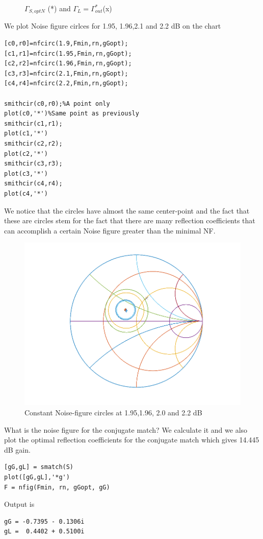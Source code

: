 \documentclass{article}
\begin{document}
\begin{multicols}{2}
\begin{figure}[H]
  \caption{$\Gamma_{S,optN}$ (*) and $\Gamma_L=\Gamma_{out}^*$(x)}
  \label{fig4}
\end{figure}
We plot Noise figure cirlces for 1.95, 1.96,2.1 and 2.2 dB on the chart
\begin{verbatim}
[c0,r0]=nfcirc(1.9,Fmin,rn,gGopt);
[c1,r1]=nfcirc(1.95,Fmin,rn,gGopt);
[c2,r2]=nfcirc(1.96,Fmin,rn,gGopt);
[c3,r3]=nfcirc(2.1,Fmin,rn,gGopt);
[c4,r4]=nfcirc(2.2,Fmin,rn,gGopt);

smithcir(c0,r0);%A point only
plot(c0,'*')%Same point as previously
smithcir(c1,r1);
plot(c1,'*')
smithcir(c2,r2);
plot(c2,'*')
smithcir(c3,r3);
plot(c3,'*')
smithcir(c4,r4);
plot(c4,'*')
\end{verbatim}
We notice that the circles have almost the same
center-point and the fact that these are circles
stem for the fact that there are many reflection coefficients
that can accomplish a certain Noise figure greater than the minimal NF.
\begin{figure}[H]
\centering
  \includegraphics[width=\linewidth]{NoisefigureCircles.png}
  \caption{Constant Noise-figure circles at 1.95,1.96, 2.0 and 2.2 dB}
  \label{fig4}
\end{figure}
What is the noise figure for the conjugate match?
We calculate it and we also plot the optimal reflection
coefficients for the conjugate match which gives 14.445 dB gain.
\begin{verbatim}
[gG,gL] = smatch(S)
plot([gG,gL],'*g')
F = nfig(Fmin, rn, gGopt, gG)
\end{verbatim}
Output is
\begin{verbatim}
gG = -0.7395 - 0.1306i
gL =  0.4402 + 0.5100i

\end{verbatim}
\end{multicols}
\end{document}

